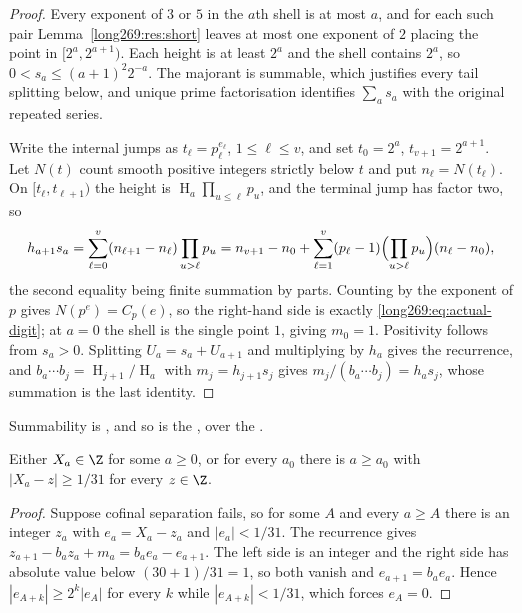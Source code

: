 \documentclass[11pt]{article}
\newcommand{\hgt}{\operatorname{H}}
\begin{document}
\begin{proof}
Every exponent of $3$ or $5$ in the $a$th shell is at most $a$, and for each
such pair Lemma~\ref{long269:res:short} leaves at most one exponent of $2$ placing the
point in $[2^{a},2^{a+1})$.  Each height is at least $2^{a}$ and the shell
contains $2^{a}$, so $0<s_a\le(a+1)^{2}2^{-a}$.  The majorant is summable,
which justifies every tail splitting below, and unique prime factorisation
identifies $\sum_a s_a$ with the original repeated series.

Write the internal jumps as $t_\ell=p_\ell^{e_\ell}$, $1\le\ell\le v$, and set
$t_0=2^{a}$, $t_{v+1}=2^{a+1}$.  Let $N(t)$ count smooth positive integers
strictly below $t$ and put $n_\ell=N(t_\ell)$.  On $[t_\ell,t_{\ell+1})$ the
height is $\hgt_a\prod_{u\le\ell}p_u$, and the terminal jump has factor two, so
\[
 h_{a+1}s_a
 =\sum_{\ell=0}^{v}(n_{\ell+1}-n_\ell)\prod_{u>\ell}p_u
 =n_{v+1}-n_0+\sum_{\ell=1}^{v}(p_\ell-1)
        \Bigl(\prod_{u>\ell}p_u\Bigr)(n_\ell-n_0),
\]
the second equality being finite summation by parts.  Counting by the exponent
of $p$ gives $N(p^{e})=C_p(e)$, so the right-hand side is exactly
\eqref{long269:eq:actual-digit}; at $a=0$ the shell is the single point $1$, giving
$m_0=1$.  Positivity follows from $s_a>0$.  Splitting $U_a=s_a+U_{a+1}$ and
multiplying by $h_a$ gives the recurrence, and
$b_a\cdots b_j=\hgt_{j+1}/\hgt_a$ with $m_j=h_{j+1}s_j$ gives
$m_j/(b_a\cdots b_j)=h_as_j$, whose summation is the last identity.
\end{proof}

\noindent Summability is
,
and so is the
, over the
.

\begin{proposition}\label{long269:res:actual-dichotomy}
Either $X_a\in\Z$ for some $a\ge0$, or for every $a_0$ there is $a\ge a_0$ with
$|X_a-z|\ge1/31$ for every $z\in\Z$.
\end{proposition}

\begin{proof}
Suppose cofinal separation fails, so for some $A$ and every $a\ge A$ there is
an integer $z_a$ with $e_a=X_a-z_a$ and $|e_a|<1/31$.  The recurrence gives
$z_{a+1}-b_az_a+m_a=b_ae_a-e_{a+1}$.  The left side is an integer and the right
side has absolute value below $(30+1)/31=1$, so both vanish and
$e_{a+1}=b_ae_a$.  Hence $|e_{A+k}|\ge2^{k}|e_A|$ for every $k$ while
$|e_{A+k}|<1/31$, which forces $e_A=0$.
\end{proof}
\end{document}
